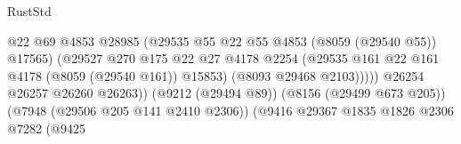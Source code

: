 \begin{lexlean}{RustStd}
\begin{coremodule}
                                                          @22
                                                          @69
                                                          @4853
                                                          @28985
                                                          (@29535
                                                            @55
                                                            @22
                                                            @55
                                                            @4853
                                                            (@8059 (@29540 @55))
                                                            @17565)
                                                          (@29527
                                                            @270
                                                            @175
                                                            @22
                                                            @27
                                                            @4178
                                                            @2254
                                                            (@29535
                                                              @161
                                                              @22
                                                              @161
                                                              @4178
                                                              (@8059 (@29540 @161))
                                                              @15853)
                                                            (@8093 @29468 @2103)))))
                                                    @26254
                                                    @26257
                                                    @26260
                                                    @26263))
                                                (@9212 (@29494 @89))
                                                (@8156 (@29499 @673 @205))
                                                (@7948 (@29506 @205 @141 @2410 @2306))
                                                (@9416
                                                  @29367
                                                  @1835
                                                  @1826
                                                  @2306
                                                  @7282
                                                  (@9425

\end{coremodule}
\end{lexlean}
